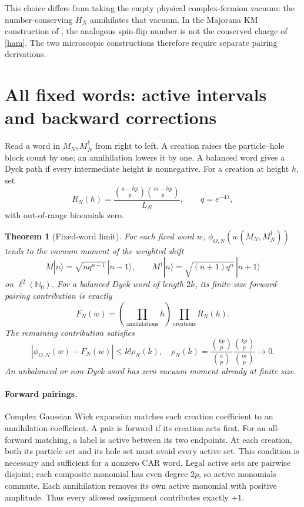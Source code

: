 \documentclass[11pt]{article}
\newtheorem{theorem}{Theorem}
\begin{document}
This choice differs from taking the empty physical complex-fermion
vacuum: the number-conserving $H_N$ annihilates that vacuum. In the
Majorana KM construction of \cite{RX}, the analogous spin-flip number
is not the conserved charge of \eqref{ham}. The two microscopic
constructions therefore require separate pairing derivations.

\newpage
\section{All fixed words: active intervals and backward corrections}
Read a word in $M_N,M_N^\dagger$ from right to left. A creation raises
the particle--hole block count by one; an annihilation lowers it by one.
A balanced word gives a Dyck path if every intermediate height is
nonnegative. For a creation at height $h$, set
\begin{equation}\label{ratio}
 R_N(h)=\frac{\binom{a-hp}{p}\binom{m-hp}{p}}{L_N},
 \qquad q=e^{-4\lambda},
\end{equation}
with out-of-range binomials zero.

\begin{theorem}[Fixed-word limit]\label{wordthm}
For each fixed word $w$, $\phi_{O,N}(w(M_N,M_N^\dagger))$ tends to
the vacuum moment of the weighted shift
\begin{equation}\label{shift}
 M|n\rangle=\sqrt{nq^{n-1}}\,|n-1\rangle,\qquad
 M^\dagger|n\rangle=\sqrt{(n+1)q^n}\,|n+1\rangle
\end{equation}
on $\ell^2(\mathbb N_0)$. For a balanced Dyck word of length $2k$,
its finite-size forward-pairing contribution is exactly
\begin{equation}\label{forward}
 F_N(w)=\left(\prod_{\text{annihilations}}h\right)
                  \prod_{\text{creations}}R_N(h).
\end{equation}
The remaining contribution satisfies
\begin{equation}\label{backbound}
 |\phi_{O,N}(w)-F_N(w)|\le k!\rho_N(k),\quad
 \rho_N(k)=\frac{\binom{kp}{p}}{\binom ap}
           \frac{\binom{kp}{p}}{\binom mp}\longrightarrow0.
\end{equation}
An unbalanced or non-Dyck word has zero vacuum moment already at
finite size.
\end{theorem}

\paragraph{Forward pairings.}
Complex Gaussian Wick expansion matches each creation coefficient
to an annihilation coefficient. A pair is forward if its creation acts
first. For an all-forward matching, a label is active between its two
endpoints. At each creation, both its particle set and its hole set
must avoid every active set. This condition is necessary and sufficient
for a nonzero CAR word. Legal active sets are pairwise disjoint; each
composite monomial has even degree $2p$, so active monomials commute.
Each annihilation removes its own active monomial with positive
amplitude. Thus every allowed assignment contributes exactly $+1$.
\end{document}
